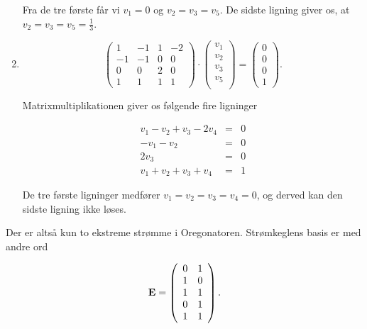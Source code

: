 \begin{enumerate}
     Fra de tre f{\o}rste f{\aa}r vi $v_1 = 0$ og $v_2 = v_3 = v_5$.
     De sidste ligning giver os, at $v_2 = v_3 = v_5 =
     \frac{1}{3}$. 
   \item
     \begin{equation}
       \left(
       \begin{array}{cccc}
         1 & -1 & 1 & -2 \\
         -1 & -1 & 0 & 0 \\
         0 & 0 & 2 & 0 \\
         1 & 1 & 1 & 1 
       \end{array}
       \right) \cdot
       \left(
       \begin{array}{c}
         v_1 \\
         v_2 \\
         v_3 \\
         v_5 \\
       \end{array}
       \right) = 
       \left(
       \begin{array}{c}
         0 \\
         0 \\
         0 \\
         1 
       \end{array}
       \right).
     \end{equation}
       
     Matrixmultiplikationen giver os f{\o}lgende fire ligninger

     \begin{eqnarray*}
       v_1 - v_2 + v_3 -2v_4 &=& 0 \\
       -v_1 - v_2 &=& 0 \\
       2v_3 &=& 0 \\
       v_1 + v_2 + v_3 + v_4 &=& 1 
     \end{eqnarray*}
     
     De tre f{\o}rste ligninger medf{\o}rer $v_1 = v_2 = v_3 = v_4 =
     0$, og derved kan den sidste ligning ikke l{\o}ses.
\end{enumerate}

Der er alts{\aa} kun to ekstreme str{\o}mme i Oregonatoren.
Str{\o}mkeglens basis er med andre ord

\begin{equation}
\mbox{${\bf E}$} = \left(
\begin{array}{cc}
0 & 1 \\
1 & 0 \\
1 & 1 \\
0 & 1 \\
1 & 1
\end{array}
\right).
\end{equation}

